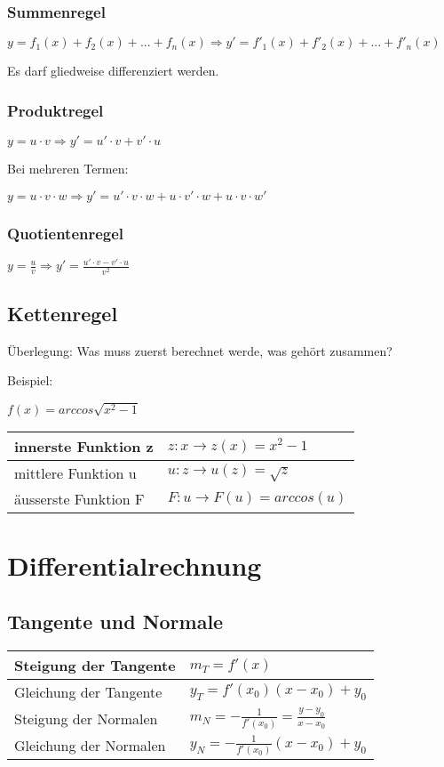 \subsection{Summenregel}
\(y = f_1(x)+f_2(x)+ ... +f_n(x) \Rightarrow y'=f'_1(x) + f'_2(x)+...+f'_n(x)\)

Es darf gliedweise differenziert werden.
\subsection{Produktregel}
\(y=u \cdot v \Rightarrow y'=u' \cdot v + v' \cdot u\)

Bei mehreren Termen:

\(y=u \cdot v \cdot w \Rightarrow y'=u' \cdot v \cdot w + u \cdot v' \cdot w + u \cdot v \cdot w' \)
\subsection{Quotientenregel}
\(y = \frac{u}{v} \Rightarrow y' = \frac{u' \cdot v - v' \cdot u}{v^2}\)

\section{Kettenregel}
Überlegung: Was muss zuerst berechnet werde, was gehört zusammen?

Beispiel:

\hspace*{10mm} \(f(x) = arccos \sqrt{x^2-1} \)
\newline
\begin{tabular}{|l|l|}
	\hline
   	innerste Funktion z & \(z: x \rightarrow z(x) = x^2-1\) \\
	\hline
	mittlere Funktion u & \(u: z \rightarrow u(z) = \sqrt{z}\) \\
	\hline
	äusserste Funktion F & \(F: u \rightarrow F(u) = arccos(u) \) \\
	\hline
 \end{tabular}

\chapter{Differentialrechnung}
\section{Tangente und Normale}
\begin{longtable}{p{}|p{}}
	Steigung der Tangente & \(m_T=f'(x)\)\\
	\hline
	Gleichung der Tangente & \(y_T = f'(x_0)(x-x_0) + y_0 \)\\
	\hline
	Steigung der Normalen & \(m_N=-\frac{1}{f'(x_0)} = \frac{y-y_0}{x-x_0} \)\\
	\hline
	Gleichung der Normalen & \(y_N = - \frac{1}{f'(x_0)}(x-x_0) + y_0 \) \\
\end{longtable}


